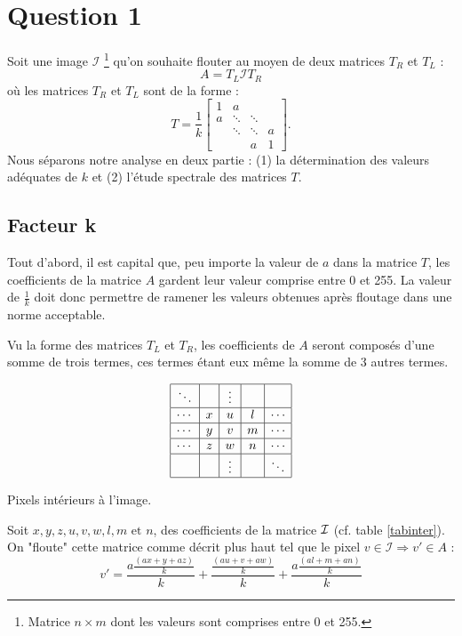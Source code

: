 \section{Question 1}
Soit une image $\mathcal{I}$ \footnote{Matrice $n \times m$ dont les valeurs sont comprises entre 0 et 255.} qu'on souhaite flouter au moyen de deux matrices $T_R$ et $T_L$ : 
$$A=T_L \mathcal{I} T_R$$
où les matrices $T_R$ et $T_L$ sont de la forme : 
$$
 T = \frac{1}{k}
 \begin{bmatrix}
    1 & a 		& 			& \\
    a & \ddots 	& \ddots 	& \\
      & \ddots 	& \ddots 	& a \\
      & 		& a			& 1
  \end{bmatrix}.
$$
Nous séparons notre analyse en deux partie : (1) la détermination des valeurs adéquates de $k$ et (2) l'étude spectrale des matrices $T$.

\subsection{Facteur k}
Tout d'abord, il  est capital que, peu importe la valeur de $\textit{a}$ dans la matrice $\textit{T}$,
les coefficients de la matrice $\textit{A}$ gardent leur valeur comprise entre 0 et 255.
La valeur de $\frac{1}{k}$ doit donc permettre de ramener les valeurs obtenues après floutage dans une norme acceptable.

Vu la forme des matrices $T_L$ et $T_R$, les coefficients de $A$ seront composés
d'une somme de trois termes,
ces termes étant eux même la somme de 3 autres termes.

\begin{table}
$$
\begin{array}{|c|c|c|c|c|} 
\hline
\ddots & & \vdots & & \\
\hline
\cdots & x & u & l & \cdots\\
\hline
\cdots & y & v & m & \cdots \\
\hline
\cdots & z & w & n & \cdots \\
\hline
 & & \vdots & & \ddots \\
\hline
\end{array} 
$$
\caption{Pixels intérieurs à l'image.} 
\label{tabinter}
\end{table}



Soit $x,y,z, u, v, w, l, m \text{ et } n$, des coefficients de la matrice $\mathcal{I}$ (cf. table \ref{tabinter}). On "floute" cette matrice comme décrit plus haut tel que le pixel $v \in \mathcal{I} \Longrightarrow v' \in A$ : 
\begin{equation} \label{kGene}
  v' = \frac{a \frac{(ax+y+az)}{k}}{k} + \frac{\frac{(au+v+aw)}{k}}{k} + \frac{a \frac{(al+m+an)}{k}}{k}
\end{equation}

